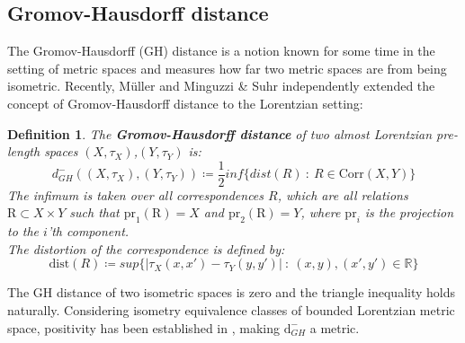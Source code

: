 \documentclass[11pt, a4paper]{article} %
\newcommand{\R}{\mathbb{R}} %
\newcommand{\dd}{\text{d}} %
\newtheorem{definition}{Definition}[section]
\theoremstyle{plain} %
\begin{document}
\subsection{Gromov-Hausdorff distance}
The Gromov-Hausdorff (GH) distance is a notion known for some time in the setting of metric spaces and measures how far two metric spaces are from being isometric.
Recently, Müller \cite{muller2022gromovMetricAndDimension} and Minguzzi \& Suhr \cite{minguzzi2022lorentzian} independently extended the concept of Gromov-Hausdorff distance to the Lorentzian setting:
\begin{definition}
The \textbf{Gromov-Hausdorff distance} of two almost Lorentzian pre-length spaces $(X,\tau_X)$,$(Y,\tau_Y)$ is:
\begin{equation*}
d_{GH}^-((X,\tau_X),(Y,\tau_Y)) \coloneqq \frac{1}{2} inf\{dist(R)\ : \ R \in \text{Corr}(X,Y)\}
\end{equation*}
The infimum is taken over all correspondences $R$, which are all relations $\text{R}\subset X\times Y$ such that $\text{pr}_1(\text{R})=X$ and $\text{pr}_2(\text{R})=Y$, where $\text{pr}_i$ is the projection to the $i$'th component.\\
The distortion of the correspondence is defined by:
\begin{equation*}
\text{dist}(R) \coloneqq sup\{|\tau_X(x,x') - \tau_Y(y,y')|\ : \ (x,y),(x',y') \in \R\}
\end{equation*}
\end{definition}
The GH distance of two isometric spaces is zero and the triangle inequality holds naturally. Considering isometry equivalence classes of bounded Lorentzian metric space, positivity has been established in \cite{minguzzi2022lorentzian}, making $\dd_{GH}^-$ a metric.
\end{document}
